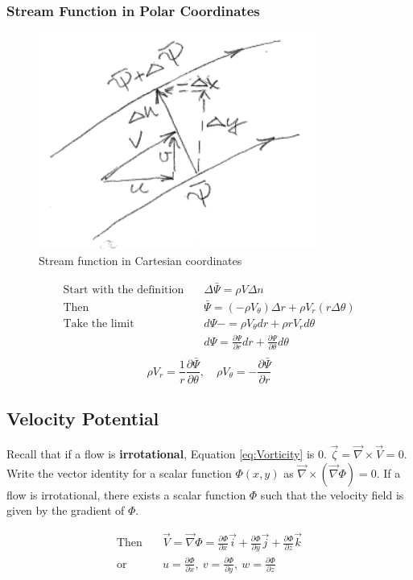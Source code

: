 \documentclass[draft=false, titlepage]{article}
\newcommand{\gradient}{\vec{\nabla}}
\newcommand{\partialfrac}[2]{\frac{\partial #1}{\partial #2}}
\begin{document}
\subsubsection{Stream Function in Polar Coordinates}
\begin{figure}[ht]
    \centering
    \includegraphics[width=0.4\linewidth]{Figures/polar_streamfunction.PNG}
    \caption{Stream function in Cartesian coordinates}
    \label{fig:PolarStreamfunction}
\end{figure}
\begin{align*}
    \text{Start with the definition} & \quad \Delta \bar{\Psi} = \rho V \Delta n \\
    \text{Then} & \quad \bar{\Psi} = (-\rho V_\theta)\Delta r + \rho V_r (r\Delta \theta)\\
    \text{Take the limit} & \quad d\Psi - =\rho V_\theta dr + \rho r V_r d\theta \\
    & \quad d\Psi = \partialfrac{\Psi}{r}dr + \partialfrac{\Psi}{\theta}d\theta\\
\end{align*}
\begin{equation}
\rho V_r = \frac{1}{r}\partialfrac{\bar{\Psi}}{\theta},\quad \rho V_\theta = -\partialfrac{\bar{\Psi}}{r}
    \label{eq:PolarStreamfunctionToVelocity}
\end{equation}

\subsection{Velocity Potential}
Recall that if a flow is \textbf{irrotational}, Equation \ref{eq:Vorticity} is 0. $\vec{\zeta} = \gradient \times \vec{V} = 0$. Write the vector identity for a scalar function $\Phi(x,y)$ as $\gradient \times (\gradient \Phi) = 0$. If a flow is irrotational, there exists a scalar function $\Phi$ such that the velocity field is given by the gradient of $\Phi$.

\begin{align*}
    \text{Then} & \quad \vec{V} = \gradient \Phi = \partialfrac{\Phi}{x}\vec{i} + \partialfrac{\Phi}{y}\vec{j} + \partialfrac{\Phi}{z}\vec{k} \\
    \text{or} & \quad u = \partialfrac{\Phi}{x},\ v = \partialfrac{\Phi}{y},\ w = \partialfrac{\Phi}{z}\\
\end{align*}
\end{document}
